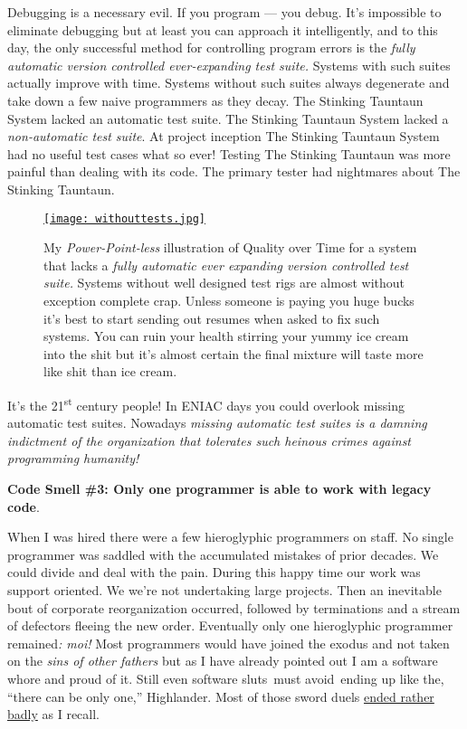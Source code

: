 Debugging is a necessary evil. If you program --- you debug. It's
impossible to eliminate debugging but at least you can approach it
intelligently, and to this day, the only successful method for
controlling program errors is the \emph{fully automatic version
controlled ever-expanding test suite.} Systems with such suites actually
improve with time. Systems without such suites always degenerate and
take down a few naive programmers as they decay. The Stinking Tauntaun
System lacked an automatic test suite. The Stinking Tauntaun System
lacked a \emph{non-automatic test suite}. At project inception The Stinking Tauntaun System had no
useful test cases what so ever! Testing The Stinking Tauntaun was more
painful than dealing with its code. The primary tester had nightmares
about The Stinking Tauntaun.


\begin{figure}[htbp]
\centering
\href{https://bakerjd99.wordpress.com/2015/04/12/cutting-the-stinking-tauntaun-and-other-adventures-in-software-archeology/withouttests/}{\texttt{[image: withouttests.jpg]}}
\caption[My \emph{Power-Point-less} illustration of Quality over Time]{My \emph{Power-Point-less} illustration of Quality over Time for a system that
lacks a \emph{fully automatic ever expanding version controlled test suite.}
Systems without well designed test rigs are almost without exception
complete crap. Unless someone is paying you huge bucks it's best to
start sending out resumes when asked to fix such systems. You can ruin
your health stirring your yummy ice cream into the shit but it's almost
certain the final mixture will taste more like shit than
ice cream.}
\label{fig:4971X1}
\end{figure}



It's the 21\textsuperscript{st} century people! In ENIAC days you could
overlook missing automatic test suites. Nowadays \emph{missing automatic
test suites is a damning indictment of the organization that tolerates
such heinous crimes against programming humanity!}

\medskip
\noindent\textbf{Code Smell \#3: Only one programmer is able to work with legacy
code}.
\medskip

When I was hired there were a few hieroglyphic programmers on staff. No
single programmer was saddled with the accumulated mistakes of prior
decades. We could divide and deal with the pain. During this happy time
our work was support oriented. We we're not undertaking large projects.
Then an inevitable bout of corporate reorganization occurred, followed
by terminations and a stream of defectors fleeing the new order.
Eventually only one hieroglyphic programmer remained\emph{: moi!} Most
programmers would have joined the exodus and not taken on the \emph{sins
of other fathers} but as I have already pointed out I am a software
whore and proud of it. Still even software sluts~must avoid~ending up
like the, ``there can be only one,'' Highlander. Most of those sword
duels \href{https://www.youtube.com/watch?v=_j6_H-PSml0}{ended rather
badly} as I recall.

